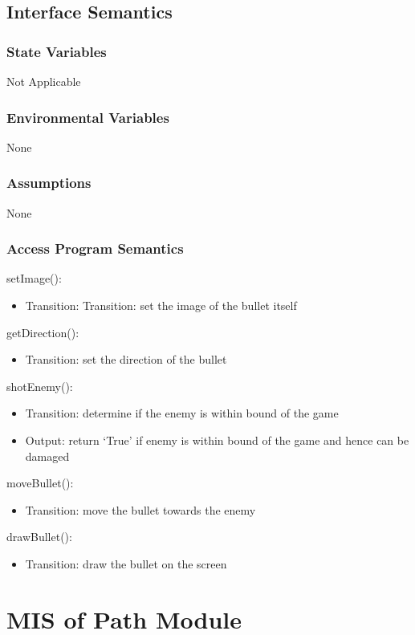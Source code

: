 \documentclass[12,english]{article}
\begin{document}
\subsection{Interface Semantics}
\subsubsection{State Variables}
Not Applicable 
\subsubsection{Environmental Variables}
None
\subsubsection{Assumptions}
None
\subsubsection{Access Program Semantics}

\noindent setImage():
\begin{itemize}
    \item Transition: Transition: set the image of the bullet itself
\end{itemize}

\noindent getDirection():
\begin{itemize}
    \item Transition: set the direction of the bullet
\end{itemize}

\noindent shotEnemy():
\begin{itemize}
    \item Transition: determine if the enemy is within bound of the game
    \item Output: return ‘True’ if enemy is within bound of the game and hence can be damaged
\end{itemize}

\noindent moveBullet():
\begin{itemize}
    \item Transition: move the bullet towards the enemy
\end{itemize}

\noindent drawBullet():
\begin{itemize}
    \item Transition: draw the bullet on the screen
\end{itemize}

\section{MIS of Path Module}
\end{document}
